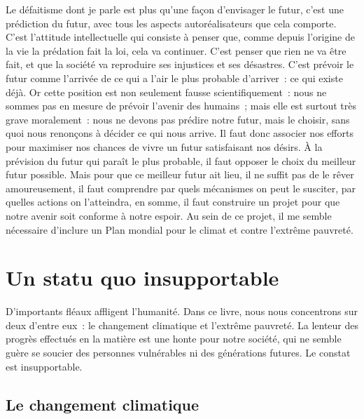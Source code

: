 \documentclass[a5paper,french]{memoir}
\begin{document}
Le défaitisme dont je parle est plus qu'une façon d'envisager le futur, c'est une prédiction du futur, avec tous les aspects autoréalisateurs que cela comporte. C'est l'attitude intellectuelle qui consiste à penser que, comme depuis l'origine de la vie la prédation fait la loi, cela va continuer. C'est penser que rien ne va être fait, et que la société va reproduire ses injustices et ses désastres. C'est prévoir le futur comme l'arrivée de ce qui a l'air le plus probable d'arriver~: ce qui existe déjà. Or cette position est non seulement fausse scientifiquement~: nous ne sommes pas en mesure de prévoir l'avenir des humains~; mais elle est surtout très grave moralement~: nous ne devons pas prédire notre futur, mais le choisir, sans quoi nous renonçons à décider ce qui nous arrive. Il faut donc associer nos efforts pour maximiser nos chances de vivre un futur satisfaisant nos désirs. À la prévision du futur qui paraît le plus probable, il faut opposer le choix du meilleur futur possible. Mais pour que ce meilleur futur ait lieu, il ne suffit pas de le rêver amoureusement, il faut comprendre par quels mécanismes on peut le susciter, par quelles actions on l'atteindra, en somme, il faut construire un projet pour que notre avenir soit conforme à notre espoir.
%
Au sein de ce projet, il me semble nécessaire d'inclure un Plan mondial pour le climat et contre l'extrême pauvreté.


\chapter{Un statu quo insupportable\label{ch:statu_quo}}

D'importants fléaux affligent l'humanité. Dans ce livre, nous nous 
concentrons sur deux d'entre eux~: le changement climatique et l'extrême pauvreté. La lenteur des progrès effectués en la matière est une honte pour notre société, qui ne semble guère se soucier des personnes vulnérables ni des générations futures. Le constat est insupportable.

\section{Le changement climatique}
\end{document}
